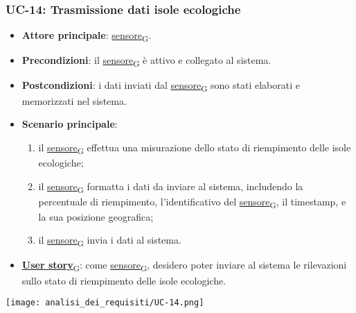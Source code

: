 \subsubsection{UC-14: Trasmissione dati isole ecologiche}
\begin{itemize}
	\item \textbf{Attore principale}: \href{https://7last.github.io/docs/pb/documentazione-interna/glossario\#sensore}{sensore\textsubscript{G}}.
	\item \textbf{Precondizioni}: il \href{https://7last.github.io/docs/pb/documentazione-interna/glossario\#sensore}{sensore\textsubscript{G}} è attivo e collegato al sistema.
	\item \textbf{Postcondizioni}: i dati inviati dal \href{https://7last.github.io/docs/pb/documentazione-interna/glossario\#sensore}{sensore\textsubscript{G}} sono stati elaborati e memorizzati nel sistema.
	\item \textbf{Scenario principale}:
	      \begin{enumerate}
		      \item il \href{https://7last.github.io/docs/pb/documentazione-interna/glossario\#sensore}{sensore\textsubscript{G}} effettua una misurazione dello stato di riempimento delle isole ecologiche;
		      \item il \href{https://7last.github.io/docs/pb/documentazione-interna/glossario\#sensore}{sensore\textsubscript{G}} formatta i dati da inviare al sistema, includendo la percentuale di riempimento, l'identificativo del \href{https://7last.github.io/docs/pb/documentazione-interna/glossario\#sensore}{sensore\textsubscript{G}},
		            il timestamp, e la sua posizione geografica;
		      \item il \href{https://7last.github.io/docs/pb/documentazione-interna/glossario\#sensore}{sensore\textsubscript{G}} invia i dati al sistema.
	      \end{enumerate}
	\item \href{https://7last.github.io/docs/pb/documentazione-interna/glossario\#user-story}{\textbf{User story}\textsubscript{G}}: come \href{https://7last.github.io/docs/pb/documentazione-interna/glossario\#sensore}{sensore\textsubscript{G}}, desidero poter inviare al sistema le rilevazioni sullo stato di riempimento delle isole ecologiche.
\end{itemize}

\begin{center}
	\texttt{[image: analisi\_dei\_requisiti/UC-14.png]}
\end{center}

